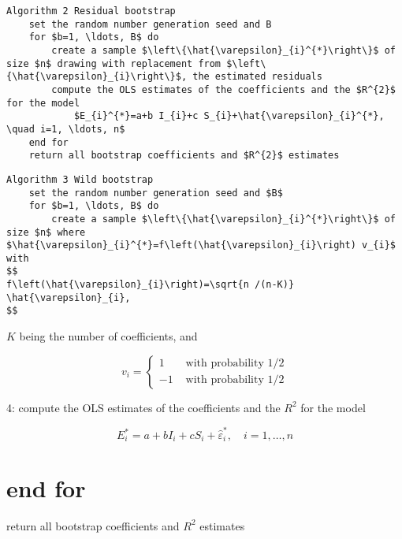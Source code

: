 \begin{verbatim}
Algorithm 2 Residual bootstrap
    set the random number generation seed and B
    for $b=1, \ldots, B$ do
        create a sample $\left\{\hat{\varepsilon}_{i}^{*}\right\}$ of size $n$ drawing with replacement from $\left\{\hat{\varepsilon}_{i}\right\}$, the estimated residuals
        compute the OLS estimates of the coefficients and the $R^{2}$ for the model
            $E_{i}^{*}=a+b I_{i}+c S_{i}+\hat{\varepsilon}_{i}^{*}, \quad i=1, \ldots, n$
    end for
    return all bootstrap coefficients and $R^{2}$ estimates
\end{verbatim}

\begin{verbatim}
Algorithm 3 Wild bootstrap
    set the random number generation seed and $B$
    for $b=1, \ldots, B$ do
        create a sample $\left\{\hat{\varepsilon}_{i}^{*}\right\}$ of size $n$ where $\hat{\varepsilon}_{i}^{*}=f\left(\hat{\varepsilon}_{i}\right) v_{i}$ with
$$
f\left(\hat{\varepsilon}_{i}\right)=\sqrt{n /(n-K)} \hat{\varepsilon}_{i},
$$
\end{verbatim}

$K$ being the number of coefficients, and

$$
v_{i}= \begin{cases}1 & \text { with probability } 1 / 2 \\ -1 & \text { with probability } 1 / 2\end{cases}
$$

4: compute the OLS estimates of the coefficients and the $R^{2}$ for the model

$$
E_{i}^{*}=a+b I_{i}+c S_{i}+\hat{\varepsilon}_{i}^{*}, \quad i=1, \ldots, n
$$

\section{end for}
return all bootstrap coefficients and $R^{2}$ estimates


